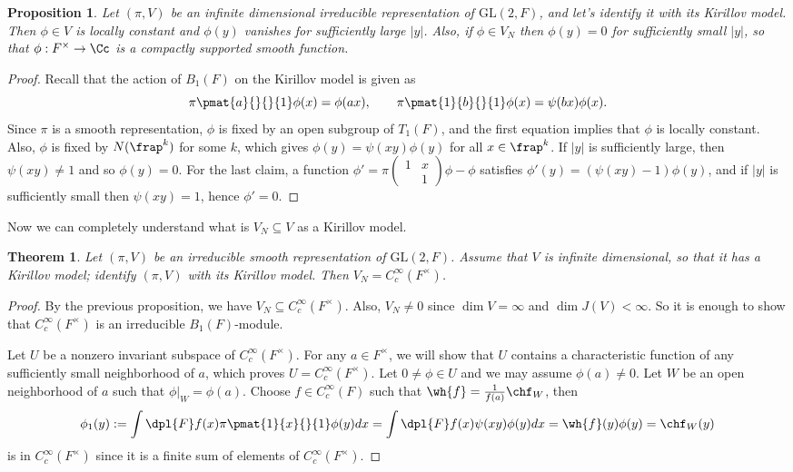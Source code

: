 \documentclass{article}
\newtheorem{theorem}{Theorem}[section]
\newcommand{\GL}{\mathrm{GL}}
\newcommand{\smat}[4]{\left(\begin{smallmatrix} #1 & #2 \\ #3 & #4 \end{smallmatrix}\right)}
\newtheorem{proposition}{Proposition}[section]
\begin{document}
\begin{proposition}
Let $(\pi, V)$ be an infinite dimensional  irreducible representation of $\GL(2, F)$, and let's identify it with its Kirillov model. 
Then $\phi\in V$ is locally constant and $\phi(y)$ vanishes for sufficiently large $|y|$. 
Also, if $\phi\in V_N$ then $\phi(y) = 0$ for sufficiently small $|y|$, so that $\phi:F^{\times} \to \Cc$ is a compactly supported smooth function. 
\end{proposition}
\begin{proof}
Recall that the action of $B_{1}(F)$ on the Kirillov model is given as
$$
\pi\pmat{a}{}{}{1} \phi(x) = \phi(ax), \qquad \pi\pmat{1}{b}{}{1}\phi(x) = \psi(bx)\phi(x). 
$$
Since $\pi$ is a smooth representation, $\phi$ is fixed by an open subgroup of $T_1(F)$, and the first equation implies that $\phi$ is locally constant. 
Also, $\phi$ is fixed by $N(\frap^k)$ for some $k$, which gives $\phi(y) = \psi(xy) \phi(y)$ for all $x\in \frap^k$. If $|y|$ is sufficiently large, then $\psi(xy) \neq 1$ and so $\phi(y) = 0$. 
For the last claim, a function $\phi' = \pi\smat{1}{x}{}{1}\phi - \phi$ satisfies $\phi'(y) = (\psi(xy) -1 )\phi(y)$, and if $|y|$ is sufficiently small then $\psi(xy) = 1$, hence $\phi' = 0$. 
\end{proof}
Now we can completely understand what is $V_N \subseteq V$ as a Kirillov model. 
\begin{theorem}
\label{kicpt}
Let $(\pi, V)$ be an irreducible smooth representation of $\GL(2, F)$. 
Assume that $V$ is infinite dimensional, so that it has a Kirillov model; identify $(\pi, V)$ with its Kirillov model. 
Then $V_N = C_{c}^{\infty}(F^{\times})$. 
\end{theorem}
\begin{proof}
By the previous proposition, we have $V_N\subseteq C_{c}^{\infty}(F^{\times})$. 
Also, $V_N\neq 0$ since $\dim V = \infty$ and $\dim J(V) <\infty$. So it is enough to show that $C_{c}^{\infty}(F^{\times})$ is an irreducible $B_1(F)$-module. 

Let $U$ be a nonzero invariant subspace of $C_c^{\infty}(F^{\times})$. For any $a\in F^{\times}$, we will show that $U$ contains a characteristic function of any sufficiently small neighborhood of $a$, which proves $U = C_{c}^{\infty}(F^{\times})$. 
Let $0\neq \phi\in U$ and we may assume $\phi(a)\neq 0$. Let $W$ be an open neighborhood of $a$ such that $\phi|_{W} = \phi(a)$. 
Choose $f\in C_{c}^{\infty}(F)$ such that $\wh{f} = \frac{1}{f(a)} \chf_{W}$, then 
$$
\phi_1(y) := \int\dpl{F} f(x) \pi\pmat{1}{x}{}{1}\phi(y) dx = \int\dpl{F}f(x)\psi(xy)\phi(y)dx = \wh{f}(y)\phi(y) =  \chf_{W}(y)
$$
is in $C_{c}^{\infty}(F^{\times})$ since it is a finite sum of elements of $C_{c}^{\infty}(F^{\times})$. 
\end{proof}
\end{document}
